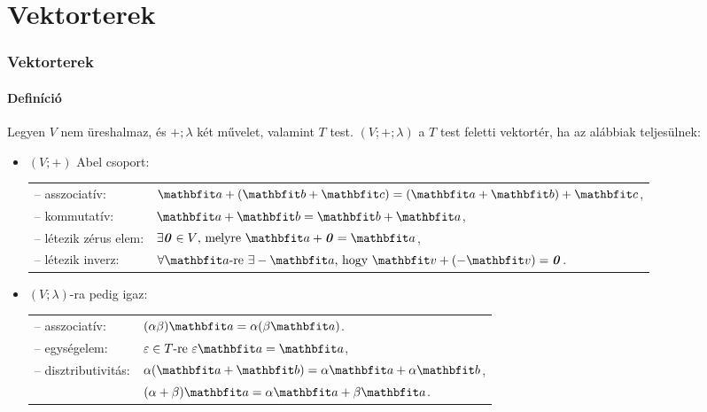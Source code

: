 \section{Vektorterek}
\begin{frame}
  \frametitle{Vektorterek}
  \framesubtitle{Definíció}

  \justifying
  Legyen $V$ nem üreshalmaz, és $+; \lambda$ két művelet, valamint $T$ test.
  $(V; +; \lambda)$ a $T$ test feletti vektortér, ha az alábbiak teljesülnek:
  \begin{itemize}
    \def\arraystretch{1.2}
    \item $(V; +)$ Abel csoport:\\[1mm]
          \begin{tabular}{p{35mm} l}
            -- asszociatív:        &
            $\rvec a + (\rvec b + \rvec c) = (\rvec a + \rvec b) + \rvec c$,
            \\
            -- kommutatív:         &
            $\rvec a + \rvec b = \rvec b + \rvec a$,
            \\
            -- létezik zérus elem: &
            $\exists \nvec \in V \text{, melyre } \rvec a + \nvec = \rvec a$,
            \\
            -- létezik inverz:     &
            $\forall \rvec a \text{-re } \exists - \rvec a \text{, hogy } \rvec v + (- \rvec v) = \nvec$.
          \end{tabular}
    \item $(V; \lambda)$-ra pedig igaz:\\[1mm]
          \begin{tabular}{p{35mm} l}
            -- asszociatív:      & $(\alpha \beta) \rvec a = \alpha (\beta \rvec a)$.
            \\
            -- egységelem:       & $\varepsilon \in T \text{-re } \varepsilon\rvec a = \rvec a$,
            \\
            -- disztributivitás: & $\alpha(\rvec a + \rvec b) = \alpha \rvec a + \alpha \rvec b$,
            \\
                                 & $(\alpha + \beta) \rvec a = \alpha \rvec a + \beta \rvec a$.
          \end{tabular}
  \end{itemize}
\end{frame}


